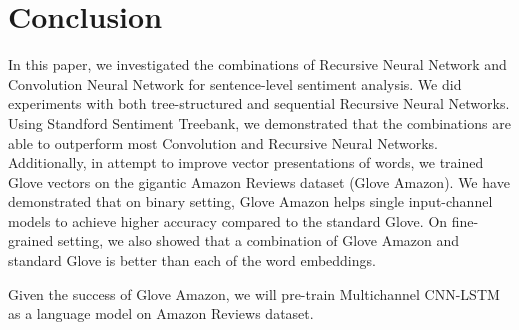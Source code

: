 \section{Conclusion}
In this paper, we investigated the combinations of Recursive Neural Network and Convolution Neural Network for sentence-level sentiment analysis.
We did experiments with both tree-structured and sequential Recursive Neural Networks.
Using Standford Sentiment Treebank, we demonstrated that the combinations are able to outperform most Convolution and Recursive Neural Networks.
Additionally, in attempt to improve vector presentations of words, we trained Glove vectors on the gigantic Amazon Reviews dataset (Glove Amazon).
We have demonstrated that on binary setting, Glove Amazon helps single input-channel models to achieve higher accuracy compared to the standard Glove.
On fine-grained setting, we also showed that a combination of Glove Amazon and standard Glove is better than each of the word embeddings.

Given the success of Glove Amazon, we will pre-train Multichannel CNN-LSTM as a language model on Amazon Reviews dataset.

